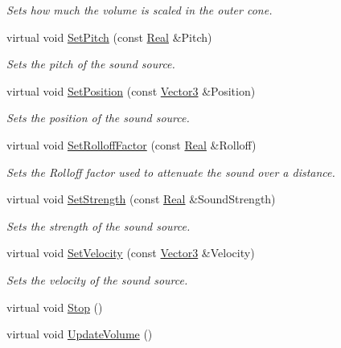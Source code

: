 \begin{DoxyCompactItemize}
\begin{DoxyCompactList}\small\item\em Sets how much the volume is scaled in the outer cone. \item\end{DoxyCompactList}\item 
virtual void \hyperlink{classMezzanine_1_1Audio_1_1Sound_a5c73f4cfc446e8760c5770c1e9b2c860}{SetPitch} (const \hyperlink{namespaceMezzanine_a726731b1a7df72bf3583e4a97282c6f6}{Real} \&Pitch)
\begin{DoxyCompactList}\small\item\em Sets the pitch of the sound source. \item\end{DoxyCompactList}\item 
virtual void \hyperlink{classMezzanine_1_1Audio_1_1Sound_ad4ae4db3fdf4d60391f049ff58a20668}{SetPosition} (const \hyperlink{classMezzanine_1_1Vector3}{Vector3} \&Position)
\begin{DoxyCompactList}\small\item\em Sets the position of the sound source. \item\end{DoxyCompactList}\item 
virtual void \hyperlink{classMezzanine_1_1Audio_1_1Sound_a4bb39c27ee5916b92cb09a6c3ba80db5}{SetRolloffFactor} (const \hyperlink{namespaceMezzanine_a726731b1a7df72bf3583e4a97282c6f6}{Real} \&Rolloff)
\begin{DoxyCompactList}\small\item\em Sets the Rolloff factor used to attenuate the sound over a distance. \item\end{DoxyCompactList}\item 
virtual void \hyperlink{classMezzanine_1_1Audio_1_1Sound_a473e3e46141c95b3ace664d2174240d2}{SetStrength} (const \hyperlink{namespaceMezzanine_a726731b1a7df72bf3583e4a97282c6f6}{Real} \&SoundStrength)
\begin{DoxyCompactList}\small\item\em Sets the strength of the sound source. \item\end{DoxyCompactList}\item 
virtual void \hyperlink{classMezzanine_1_1Audio_1_1Sound_a1c987846b4e33b70266afea6e350a7fd}{SetVelocity} (const \hyperlink{classMezzanine_1_1Vector3}{Vector3} \&Velocity)
\begin{DoxyCompactList}\small\item\em Sets the velocity of the sound source. \item\end{DoxyCompactList}\item 
virtual void \hyperlink{classMezzanine_1_1Audio_1_1Sound_a7c1d618d573b6176056c9255d06872b5}{Stop} ()
\item 
\hypertarget{classMezzanine_1_1Audio_1_1Sound_ab4d3ddd9aed1bdd3b9c4592f776d29ca}{
virtual void \hyperlink{classMezzanine_1_1Audio_1_1Sound_ab4d3ddd9aed1bdd3b9c4592f776d29ca}{UpdateVolume} ()}
\label{classMezzanine_1_1Audio_1_1Sound_ab4d3ddd9aed1bdd3b9c4592f776d29ca}


\end{DoxyCompactItemize}
